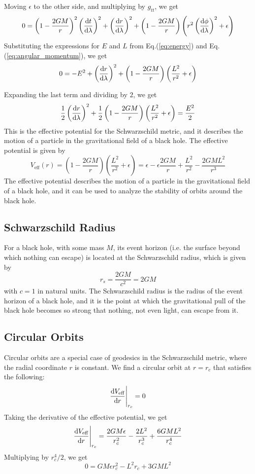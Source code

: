 \documentclass[12pt]{article}
\begin{document}
Moving $\epsilon$ to the other side, and multiplying by $g_{tt}$, we get
\[
	0 = \left(1 - \frac{2GM}{r}\right)^{2} \left(\dv{t}{\lambda}\right)^2 + \left(\dv{r}{\lambda}\right)^2 + \left(1 - \frac{2GM}{r}\right) \left(r^2 \left(\dv{\phi}{\lambda}\right)^2 + \epsilon \right)
\]
Substituting the expressions for \(E\) and \(L\) from Eq.(\ref{eq:energy}) and Eq.(\ref{eq:angular_momentum}), we get
\begin{equation}
	0 = -E^{2} + \left(\dv{r}{\lambda}\right)^2 + \left(1 - \frac{2GM}{r}\right) \left(\frac{L^{2}}{r^{2}} + \epsilon \right)
\end{equation}

Expanding the last term and dividing by $2$, we get
\[
	\frac{1}{2} \left(\dv{r}{\lambda}\right)^2 + \frac{1}{2} \left(1 - \frac{2GM}{r}\right) \left(\frac{L^{2}}{r^{2}} + \epsilon \right) = \frac{E^{2}}{2}
\]
This is the effective potential for the Schwarzschild metric, and it describes the motion of a particle in the gravitational field of a black hole.
The effective potential is given by
\begin{equation}
	V_{\text{eff}}(r) = \left(1 - \frac{2GM}{r}\right) \left(\frac{L^{2}}{r^{2}} + \epsilon \right) = \epsilon - \epsilon\frac{2GM}{r} + \frac{L^{2}}{r^{2}} - \frac{2GM L^{2}}{r^{3}}
\end{equation}
The effective potential describes the motion of a particle in the gravitational field of a black hole, and it can be used to analyze the stability of orbits around the black hole.

\subsection{Schwarzschild Radius}
For a black hole, with some mass \(M\), its event horizon (i.e. the surface beyond which nothing can escape) is located at the Schwarzschild radius, which is given by
\[
	r_{s} = \frac{2GM}{c^{2}} = 2GM
\]
with \(c = 1\) in natural units.
The Schwarzschild radius is the radius of the event horizon of a black hole, and it is the point at which the gravitational pull of the black hole becomes so strong that nothing, not even light, can escape from it.
\subsection{Circular Orbits}
Circular orbits are a special case of geodesics in the Schwarzschild metric, where the radial coordinate \(r\) is constant.
We find a circular orbit at $r = r_{c}$ that satisfies the following:
\[
	\dv{V_{\text{eff}}}{r}\Bigg|_{r_{c}} = 0
\]
Taking the derivative of the effective potential, we get
\begin{equation}\label{eq:dV_eff}
	\dv{V_{\text{eff}}}{r}\Bigg|_{r_{c}} = \frac{2GM\epsilon}{r_{c}^{2}} - \frac{2L^{2}}{r_{c}^{3}} + \frac{6GM L^{2}}{r_{c}^{4}}
\end{equation}
Multiplying by $r_{c}^{4}/2$, we get
\[
	0 = GM\epsilon r_{c}^{2} - L^{2} r_{c} + 3GM L^{2}
\]
\end{document}
